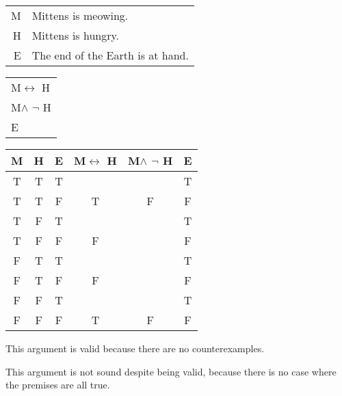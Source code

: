 \section{}
\centering
\begin{tabular}{r l}
    M & Mittens is meowing. \\
    H & Mittens is hungry. \\
    E & The end of the Earth is at hand.
\end{tabular}
\begin{tabular}{l}
    M$\leftrightarrow$ H\\
    M$\land$ $\lnot$ H\\
    \hline
    E
\end{tabular}

\begin{tabular}{c|c|c||c|c||c}
    M & H & E & M$\leftrightarrow$ H & M$\land$ $\lnot$ H & E \\
    \hline
    T & T & T &   &   & T \\
    T & T & F & T & F & F \\
    T & F & T &   &   & T \\
    T & F & F & F &   & F \\
    F & T & T &   &   & T \\
    F & T & F & F &   & F \\
    F & F & T &   &   & T \\
    F & F & F & T & F & F
\end{tabular}

\justifying
\noindent This argument is valid because there are no counterexamples.

\noindent This argument is not sound despite being valid, because there is no case where the premises are all true.